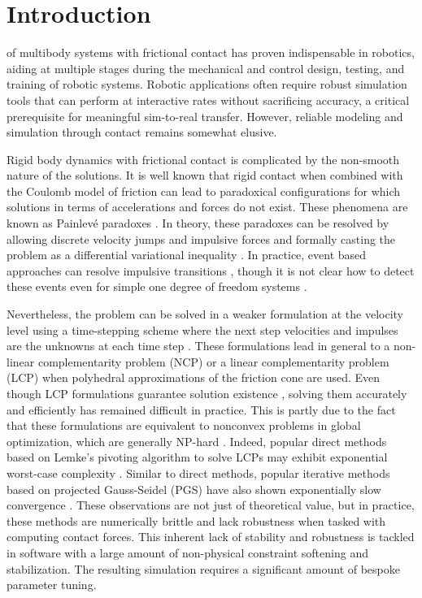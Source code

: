 
\section{Introduction}
\label{sec:introduction}

 of multibody systems with frictional contact has
proven indispensable in robotics, aiding at multiple stages during the
mechanical and control design, testing, and training of robotic systems.
Robotic applications often require robust simulation tools that can perform at
interactive rates without sacrificing accuracy, a critical prerequisite for
meaningful sim-to-real transfer. However, reliable modeling and simulation
through contact remains somewhat elusive.

Rigid body dynamics with frictional contact is complicated by the non-smooth
nature of the solutions. It is well known \cite{bib:baraff1993issues} that rigid
contact when combined with the Coulomb model of friction can lead to paradoxical
configurations for which solutions in terms of accelerations and forces do not
exist. These phenomena are known as Painlev\'e paradoxes
\cite{bib:hogan2017regularization}. In theory, these paradoxes can be resolved by allowing
discrete velocity jumps and impulsive forces and formally casting the problem as a
differential variational inequality \cite{bib:pang2008differential}. In practice,
event based approaches can resolve impulsive transitions \cite{bib:haug1986},
though it is not clear how to detect these events even for simple one degree of
freedom systems \cite{bib:hogan2017regularization}.

Nevertheless, the problem can be solved in a weaker formulation at the velocity
level using a time-stepping scheme where the next step velocities and impulses
are the unknowns at each time
step \cite{bib:stewart1996implicit, bib:anitescu1997}. These formulations lead
in general to a non-linear complementarity problem (NCP) or a linear
complementarity problem (LCP) when polyhedral approximations of the friction
cone are used. Even though LCP formulations guarantee solution existence
\cite{bib:anitescu1997, bib:stewart1998convergence}, solving them accurately and
efficiently has remained difficult in practice. This is 
partly due to the fact that these formulations are equivalent to nonconvex problems
in global optimization, which are generally NP-hard \cite{bib:Kaufman2008}.
Indeed, popular direct methods based on Lemke's pivoting algorithm to solve
LCPs may exhibit exponential worst-case complexity \cite{bib:baraff1994fast}. Similar
to direct methods, popular iterative methods based on projected
Gauss-Seidel (PGS) \cite{bib:duriez2006_realistic_haptic_rendering, bib:bullet}
have also shown exponentially slow convergence \cite{bib:erleben2007velocity}.
These observations are not just of theoretical value, but in practice,
these methods are numerically brittle and lack robustness when tasked with computing contact forces.
This inherent lack of stability and robustness is tackled in software with a
large amount of non-physical constraint softening and stabilization.
The resulting simulation requires a significant amount of bespoke parameter tuning.


